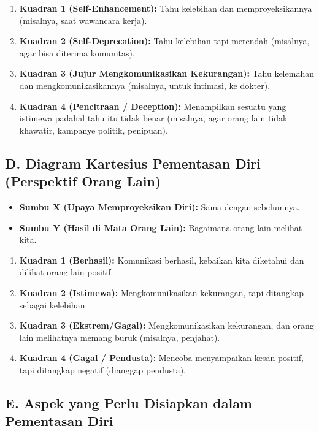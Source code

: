 \documentclass[
  letterpaper,
  DIV=11,
  numbers=noendperiod]{scrreprt}
\providecommand{\tightlist}{%
  \setlength{\itemsep}{0pt}\setlength{\parskip}{0pt}}
\begin{document}
\begin{enumerate}
\def\labelenumi{\arabic{enumi}.}
\tightlist
\item
  \textbf{Kuadran 1 (Self-Enhancement):} Tahu kelebihan dan
  memproyeksikannya (misalnya, saat wawancara kerja).
\item
  \textbf{Kuadran 2 (Self-Deprecation):} Tahu kelebihan tapi merendah
  (misalnya, agar bisa diterima komunitas).
\item
  \textbf{Kuadran 3 (Jujur Mengkomunikasikan Kekurangan):} Tahu
  kelemahan dan mengkomunikasikannya (misalnya, untuk intimasi, ke
  dokter).
\item
  \textbf{Kuadran 4 (Pencitraan / Deception):} Menampilkan sesuatu yang
  istimewa padahal tahu itu tidak benar (misalnya, agar orang lain tidak
  khawatir, kampanye politik, penipuan).
\end{enumerate}

\subsection{D. Diagram Kartesius Pementasan Diri (Perspektif Orang
Lain)}\label{d.-diagram-kartesius-pementasan-diri-perspektif-orang-lain}

\begin{itemize}
\tightlist
\item
  \textbf{Sumbu X (Upaya Memproyeksikan Diri):} Sama dengan sebelumnya.
\item
  \textbf{Sumbu Y (Hasil di Mata Orang Lain):} Bagaimana orang lain
  melihat kita.
\end{itemize}

\begin{enumerate}
\def\labelenumi{\arabic{enumi}.}
\tightlist
\item
  \textbf{Kuadran 1 (Berhasil):} Komunikasi berhasil, kebaikan kita
  diketahui dan dilihat orang lain positif.
\item
  \textbf{Kuadran 2 (Istimewa):} Mengkomunikasikan kekurangan, tapi
  ditangkap sebagai kelebihan.
\item
  \textbf{Kuadran 3 (Ekstrem/Gagal):} Mengkomunikasikan kekurangan, dan
  orang lain melihatnya memang buruk (misalnya, penjahat).
\item
  \textbf{Kuadran 4 (Gagal / Pendusta):} Mencoba menyampaikan kesan
  positif, tapi ditangkap negatif (dianggap pendusta).
\end{enumerate}

\subsection{E. Aspek yang Perlu Disiapkan dalam Pementasan
Diri}\label{e.-aspek-yang-perlu-disiapkan-dalam-pementasan-diri}
\end{document}

